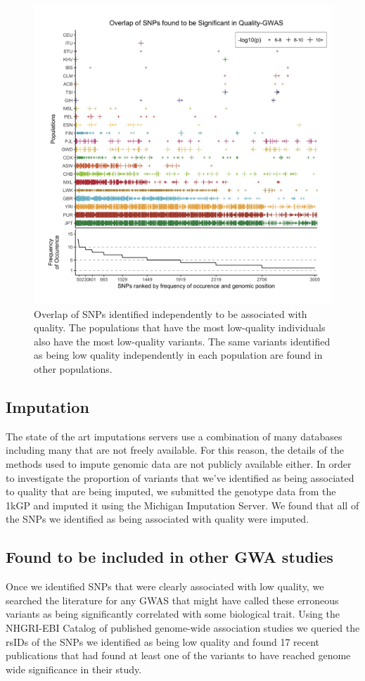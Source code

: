 \documentclass[9pt,lineno]{elife}
\begin{document}
\begin{figure}
\includegraphics[width=\hsize,keepaspectratio]{SNPOverlap6.jpg}

\caption{Overlap of SNPs identified independently to be associated with quality. 
The populations that have the most low-quality individuals also have the most low-quality variants. 
The same variants identified as being low quality independently in each population are found in other populations. }
  \label{OverLap}
\end{figure}

	\subsection{Imputation}
The state of the art imputations servers use a combination of many databases including many that are not freely available.
For this reason, the details of the methods used to impute genomic data are not publicly available either.
In order to investigate the proportion of variants that we've identified as being associated to quality that are being imputed, we submitted the genotype data from the 1kGP and imputed it using the Michigan Imputation Server.
We found that all of the SNPs we identified as being associated with quality were imputed.

	\subsection{Found to be included in other GWA studies}
Once we identified SNPs that were clearly associated with low quality, we searched the literature for any GWAS that might have called these erroneous variants as being significantly correlated with some biological trait. 
Using the NHGRI-EBI Catalog of published genome-wide association studies we queried the rsIDs of the SNPs we identified as being low quality and found 17 recent publications that had found at least one of the variants to have reached genome wide significance in their study.
\end{document}
